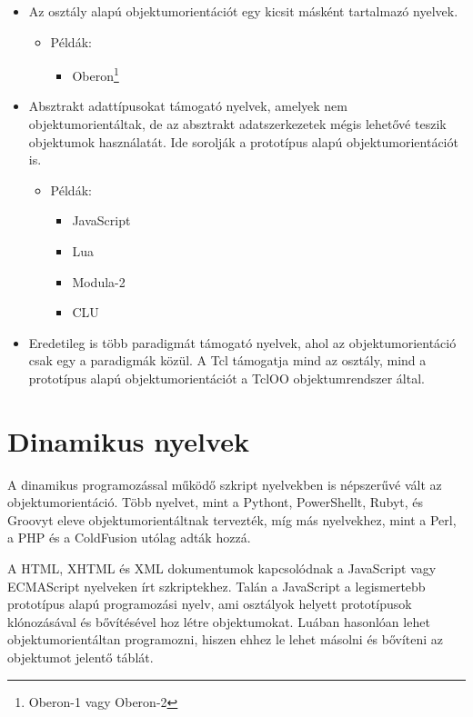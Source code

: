 \documentclass[]{thesis-ekf}
\theoremstyle{definition}
\begin{document}
\begin{itemize}
		\item Az osztály alapú objektumorientációt egy kicsit másként tartalmazó nyelvek. 
		\begin{itemize}
			\item Példák: 
			\begin{itemize}
				\item Oberon\footnote{Oberon-1 vagy Oberon-2}
			\end{itemize}
		\end{itemize}
		
		\item Absztrakt adattípusokat támogató nyelvek, amelyek nem objektumorientáltak, de az absztrakt adatszerkezetek mégis lehetővé teszik objektumok használatát. Ide sorolják a prototípus alapú objektumorientációt is. 
		\begin{itemize}
			\item Példák:
			\begin{itemize}
				\item JavaScript
				\item Lua
				\item Modula-2
				\item CLU
			\end{itemize}
		\end{itemize} 
		
		\item Eredetileg is több paradigmát támogató nyelvek, ahol az objektumorientáció csak egy a paradigmák közül. A Tcl támogatja mind az osztály, mind a prototípus alapú objektumorientációt a TclOO objektumrendszer által.
	\end{itemize}
	
	\section{Dinamikus nyelvek}
	
	A dinamikus programozással működő szkript nyelvekben is népszerűvé vált az objektumorientáció. Több nyelvet, mint a Pythont, PowerShellt, Rubyt, és Groovyt eleve objektumorientáltnak tervezték, míg más nyelvekhez, mint a Perl, a PHP és a ColdFusion utólag adták hozzá.
	
	A HTML, XHTML és XML dokumentumok kapcsolódnak a JavaScript vagy ECMAScript nyelveken írt szkriptekhez. Talán a JavaScript a legismertebb prototípus alapú programozási nyelv, ami osztályok helyett prototípusok klónozásával és bővítésével hoz létre objektumokat. Luában hasonlóan lehet objektumorientáltan programozni, hiszen ehhez le lehet másolni és bővíteni az objektumot jelentő táblát.
	
\end{document}
